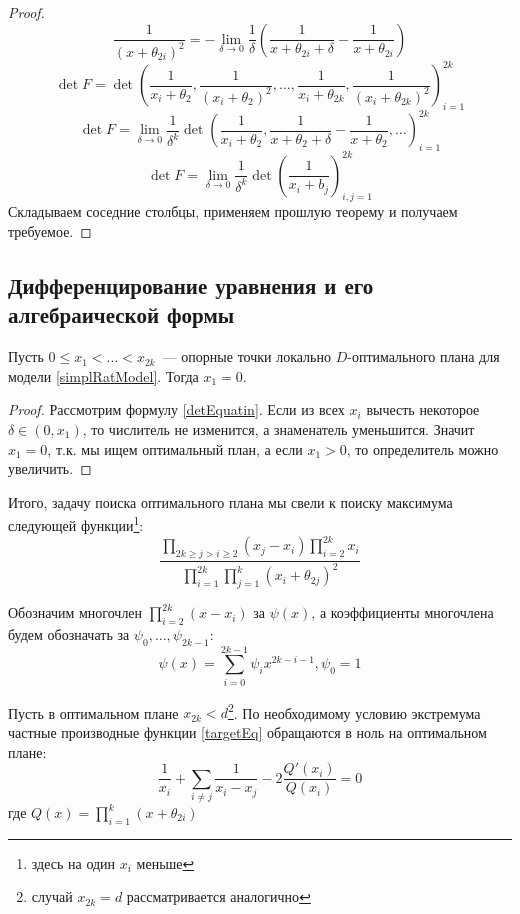 \begin{proof}
$$ \frac{1}{(x + \theta_{2i})^2} = -\lim\limits_{\delta \rightarrow 0} \frac{1}{\delta}\left(\frac{1}{x+\theta_{2i}+\delta} - \frac{1}{x+\theta_{2i}}\right)$$
$$\det F = \det \left(\frac{1}{x_i + \theta_2}, \frac{1}{(x_i + \theta_2)^2}, …, \frac{1}{x_i+\theta_{2k}}, \frac{1}{(x_i + \theta_{2k})^2} \right)_{i=1}^{2k}$$
$$ \det F = \lim \limits_{\delta \rightarrow 0} \frac{1}{\delta^k} \det \left(\frac{1}{x_i + \theta_2}, \frac{1}{x+\theta_{2}+\delta} - \frac{1}{x+\theta_{2}}, … \right)_{i=1}^{2k}$$
$$\det F = \lim \limits_{\delta \rightarrow 0} \frac{1}{\delta^k}\det \left( \frac{1}{x_i + b_j} \right)_{i,j=1}^{2k}$$
Складываем соседние столбцы, применяем прошлую теорему и получаем требуемое.
\end{proof}

\subsection{Дифференцирование уравнения и его алгебраической формы}

\begin{thm}
    Пусть $0 \leq x_1 < … < x_{2k}$ — опорные точки локально $D$-оптимального плана для модели \eqref{simplRatModel}.  Тогда $x_1 = 0$.
\end{thm}
\begin{proof}
Рассмотрим формулу \eqref{detEquatin}. Если из всех $x_i$ вычесть некоторое $\delta \in (0, x_1)$, то числитель не изменится, а знаменатель уменьшится. Значит $x_1 = 0$, т.к. мы ищем оптимальный план, а если $x_1 >0$, то определитель можно увеличить.
\end{proof}

Итого, задачу поиска оптимального плана мы свели к поиску максимума следующей функции\footnote{здесь на один $x_i$ меньше}:
\begin{equation}
\label{targetEq}
\frac{\prod\limits_{2k\ge j>i\ge2}(x_j - x_i) \prod_{i=2}^{2k} x_i}{\prod\limits_{i=1}^{2k}\prod\limits_{j=1}^{k} (x_i + \theta_{2j})^2}
\end{equation}

Обозначим многочлен $\prod\limits_{i=2}^{2k}(x-x_i)$ за $\psi(x)$, а коэффициенты многочлена будем обозначать за $\psi_0, …, \psi_{2k-1}$:
$$\psi(x) = \sum\limits_{i=0}^{2k-1}\psi_i x^{2k-i-1}, \psi_0 = 1$$

Пусть в оптимальном плане $x_{2k} < d$\footnote{случай $x_{2k}=d$ рассматривается аналогично}. По необходимому условию экстремума частные производные   функции \eqref{targetEq} обращаются в ноль на оптимальном плане:
$$ \frac{1}{x_i} + \sum\limits_{i\neq j} \frac{1}{x_i- x_j} - 2 \frac{Q'(x_i)}{Q(x_i)} = 0$$
где $Q(x)= \prod_{i=1}^k(x+\theta_{2i})$ 

